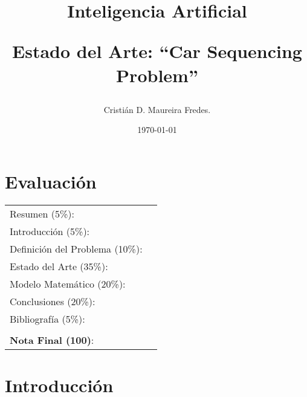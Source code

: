 \documentclass[letter, 10pt]{article}
\begin{document}

\pagestyle{empty}

\title{Inteligencia Artificial \\ \begin{Large}Estado del Arte: ``Car Sequencing Problem''\end{Large}}
\author{Cristián D. Maureira Fredes.}
\date{\today}
\maketitle


\section*{Evaluación}

\begin{tabular}{ll}
Resumen (5\%): & \underline{\hspace{2cm}} \\
Introducción (5\%):  & \underline{\hspace{2cm}} \\
Definición del Problema (10\%):  & \underline{\hspace{2cm}} \\
Estado del Arte (35\%):  & \underline{\hspace{2cm}} \\
Modelo Matemático (20\%): &  \underline{\hspace{2cm}}\\
Conclusiones (20\%): &  \underline{\hspace{2cm}}\\
Bibliografía (5\%): & \underline{\hspace{2cm}}\\
 &  \\
\textbf{Nota Final (100)}:   & \underline{\hspace{2cm}}
\end{tabular}

\begin{abstract}

\end{abstract}

\section{Introducción}
\label{sec:introduccion}

\end{document}

